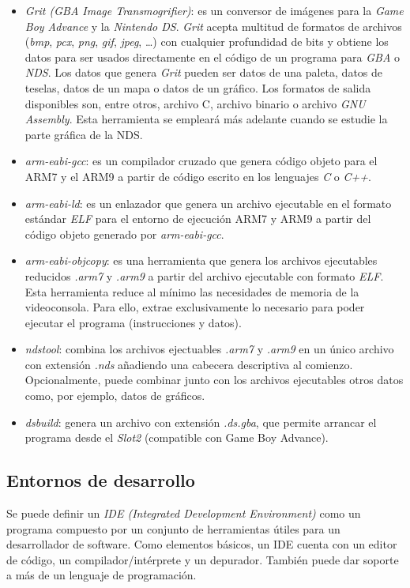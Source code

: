 \begin{itemize}
\item \textit{Grit (GBA Image Transmogrifier)}: es un conversor de imágenes para la \textit{Game Boy Advance} y la \textit{Nintendo DS}. \textit{Grit} acepta multitud de formatos de archivos (\textit{bmp}, \textit{pcx}, \textit{png}, \textit{gif}, \textit{jpeg}, \ldots) con cualquier profundidad de bits y obtiene los datos para
ser usados directamente en el código de un programa para \textit{GBA} o \textit{NDS}. Los datos que genera \textit{Grit} pueden ser datos de una paleta, datos de teselas, datos de un mapa o datos de un gráfico. Los formatos de salida disponibles son, entre otros, archivo C, archivo binario o archivo \textit{GNU Assembly}. Esta herramienta se empleará más adelante cuando se estudie la parte gráfica de la NDS.
%
\item \textit{arm-eabi-gcc}: es un compilador cruzado que genera código objeto para el ARM7 y el ARM9 a partir de código escrito en los lenguajes \textit{C} o \textit{C++}.
%
\item \textit{arm-eabi-ld}: es un enlazador que genera un archivo ejecutable en el formato estándar
\textit{ELF} para el entorno de ejecución ARM7 y ARM9 a partir del código objeto generado por \textit{arm-eabi-gcc}.
%
\item \textit{arm-eabi-objcopy}: es una herramienta que genera los archivos ejecutables reducidos \textit{.arm7} y \textit{.arm9} a partir del archivo ejecutable con formato \textit{ELF}. Esta herramienta reduce al mínimo las necesidades de memoria de la videoconsola. Para ello, extrae exclusivamente lo necesario para poder ejecutar el programa (instrucciones y datos). 
%
\item \textit{ndstool}: combina los archivos ejectuables \textit{.arm7} y \textit{.arm9} en un único archivo con extensión \textit{.nds} añadiendo una cabecera descriptiva al comienzo. Opcionalmente, puede combinar junto con los archivos ejecutables otros datos como, por ejemplo, datos de gráficos.
%
\item \textit{dsbuild}: genera un archivo con extensión \textit{.ds.gba}, que permite arrancar el programa desde el \textit{Slot2} (compatible con Game Boy Advance).
\end{itemize}

\subsection{Entornos de desarrollo}
Se puede definir un \textit{IDE (Integrated Development Environment)} como un programa compuesto por un conjunto de herramientas útiles para un desarrollador de software. Como elementos básicos, un IDE cuenta con un editor de código, un compilador/intérprete y un depurador.  También puede dar soporte a más de un lenguaje de programación.

